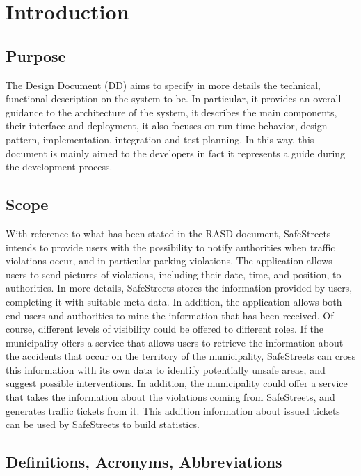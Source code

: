 \documentclass[../RASD.tex]{subfiles}
\begin{document}
    \chapter{Introduction}\label{ch:introduction}
    \section{Purpose}\label{sec:purpose}
    The Design Document (DD) aims to specify in more details the technical, functional description on the system-to-be.
    In particular, it provides an overall guidance to the architecture of the system, it describes the main components,
    their interface and deployment, it also focuses on run-time behavior, design pattern, implementation, integration and test planning.
    In this way, this document is mainly aimed to the developers in fact it represents a guide during the development process.
    \section{Scope}\label{sec:scope}
    With reference to what has been stated in the RASD document, SafeStreets intends to provide users with the possibility
    to notify authorities when traffic violations occur, and in particular parking violations.
    The application allows users to send pictures of violations, including their date, time, and position, to authorities.
    In more details, SafeStreets stores the information provided by users, completing it with suitable meta-data.
    In addition, the application allows both end users and authorities to mine the information that has been received.
    Of course, different levels of visibility could be offered to different roles.
    If the municipality offers a service that allows users to retrieve the information about the accidents that occur on the territory of the municipality,
    SafeStreets can cross this information with its own data to identify potentially unsafe areas, and suggest possible interventions.
    In addition, the municipality could offer a service that takes the information about the violations coming from SafeStreets, and generates traffic tickets from it.
    This addition information about issued tickets can be used by SafeStreets to build statistics.
    \newpage
    \section{Definitions, Acronyms, Abbreviations}\label{sec:definitions,-acronyms,-abbreviations}
\end{document}
